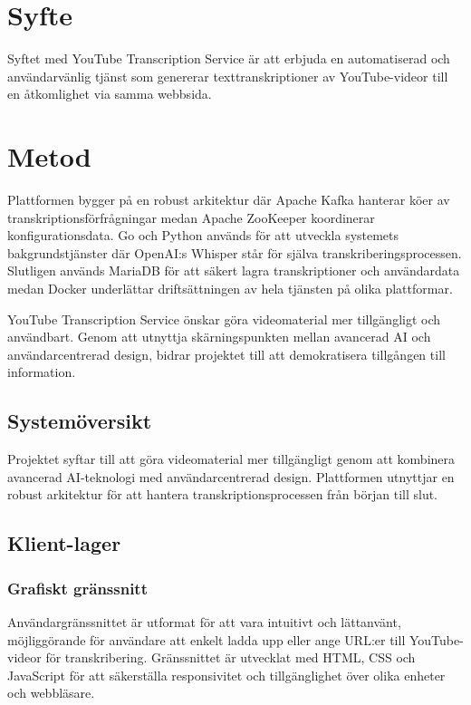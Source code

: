 \section{Syfte}
Syftet med YouTube Transcription Service är att erbjuda en automatiserad och
användarvänlig tjänst som genererar texttranskriptioner av YouTube-videor till
en åtkomlighet via samma webbsida. 

\section{Metod}

Plattformen bygger på en robust arkitektur där Apache Kafka hanterar köer av
transkriptionsförfrågningar medan Apache ZooKeeper koordinerar
konfigurationsdata. Go och Python används för att utveckla systemets
bakgrundstjänster där OpenAI:s Whisper står för själva
transkriberingsprocessen. Slutligen används MariaDB för att säkert lagra
transkriptioner och användardata medan Docker underlättar driftsättningen av
hela tjänsten på olika plattformar.

YouTube Transcription Service önskar göra videomaterial mer tillgängligt och
användbart. Genom att utnyttja skärningspunkten mellan avancerad AI och
användarcentrerad design, bidrar projektet till att demokratisera tillgången
till information.

\subsection{Systemöversikt}
Projektet syftar till att göra videomaterial mer tillgängligt genom att
kombinera avancerad AI-teknologi med användarcentrerad design. Plattformen
utnyttjar en robust arkitektur för att hantera transkriptionsprocessen från
början till slut.

\subsection{Klient-lager}

\subsubsection{Grafiskt gränssnitt}
Användargränssnittet är utformat för att vara intuitivt och lättanvänt,
möjliggörande för användare att enkelt ladda upp eller ange URL:er till
YouTube-videor för transkribering. Gränssnittet är utvecklat med HTML, CSS och
JavaScript för att säkerställa responsivitet och tillgänglighet över olika
enheter och webbläsare.

